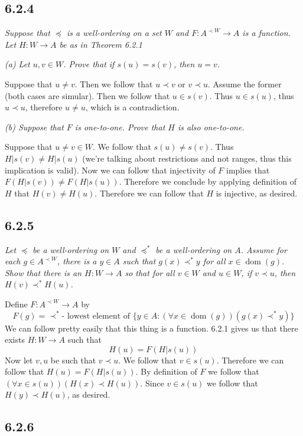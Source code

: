 \documentclass[11pt,oneside,titlepage]{book}
\DeclareMathOperator \dom {dom}
\begin{document}
\subsection*{6.2.4}

\textit{Suppose that $\preceq$ is a well-ordering on a set $W$ and $F: A^{\prec W} \to A$ is
  a function. Let $H: W \to A$ be as in Theorem 6.2.1}

\textit{(a) Let $u, v \in W$. Prove that if $s(u) = s(v)$, then $u = v$.}

Suppose that $u \neq v$. Then we follow that $u \prec v$ or $v \prec u$. Assume the former
(both cases are simular). Then we follow that $u \in s(v)$. Thus
$u \in s(u)$, thus $u \prec u$, therefore $u \neq u$, which is a contradiction.

\textit{(b) Suppose that $F$ is one-to-one. Prove that $H$ is also one-to-one.}

Suppose that $u \neq v \in W$. We follow that $s(u) \neq s(v)$. Thus $H|s(v) \neq H|s(u)$
(we're talking about restrictions and not ranges, thus this implication is valid). Now we
can follow that injectivity of $F$ implies that  $F(H|s(v)) \neq F(H|s(u))$. Therefore
we conclude by applying definition of $H$ that $H(v) \neq H(u)$. Therefore we can follow that
$H$ is injective, as desired.

\subsection*{6.2.5}

\textit{Let $\preceq$ be a well-ordering on $W$ and $\preceq^*$ be a well-ordering on $A$.
  Assume for each $g \in A^{\prec W}$, there is a $y \in A$ such that $g(x) \prec^* y$ for
  all $x \in \dom(g)$. Show that there is an $H: W \to A$ so that for all $v \in W$ and
  $u \in W$, if $v \prec u$, then $H(v) \prec^* H(u)$.}

Define $F: A^{\prec W} \to A$ by
$$F(g) = \prec^*\text{- lowest element of
  $\{y \in A: (\forall x \in \dom(g))(g(x) \prec^* y)\}$}$$
We can follow pretty easily that this thing is a function. 6.2.1 gives us that there exists
$H: W \to A$ such that
$$H(u) = F(H|s(u))$$
Now let $v, u$ be such that $v \prec u$. We follow that $v \in s(u)$. Therefore
we can follow that $H(u) = F(H|s(u))$. By definition of $F$ we follow that
$(\forall x \in s(u))(H(x) \prec H(u))$. Since $v \in s(u)$ we follow that
$H(y) \prec H(u)$, as desired.

\subsection*{6.2.6}
\end{document}
